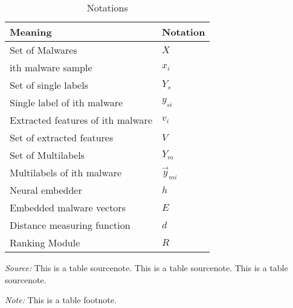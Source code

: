 \begin{table}%
\caption{Notations}
\label{tab:one}
\begin{minipage}{\columnwidth}
\begin{center}
\begin{tabular}{ll}
\toprule
Meaning & Notation\\
\midrule
  Set of Malwares     & $X$ \\
  ith malware sample  & $x_i$ \\
  Set of single labels & $Y_s$ \\
  Single label of ith malware    & $y_{si}$ \\
  Extracted features of ith malware & $v_i$ \\
  Set of extracted features   & $V$ \\
  Set of Multilabels   & $Y_m$ \\
  Multilabels of ith malware & $\vec{y}_{mi}$\\
  Neural embedder & $h$ \\
  Embedded malware vectors & $E$ \\
  Distance measuring function & $d$ \\
  Ranking Module & $R$\\
\bottomrule
\end{tabular}
\end{center}
\bigskip\centering
\footnotesize\emph{Source:} This is a table
 sourcenote. This is a table sourcenote. This is a table
 sourcenote.

 \emph{Note:} This is a table footnote.
\end{minipage}
\end{table}%




